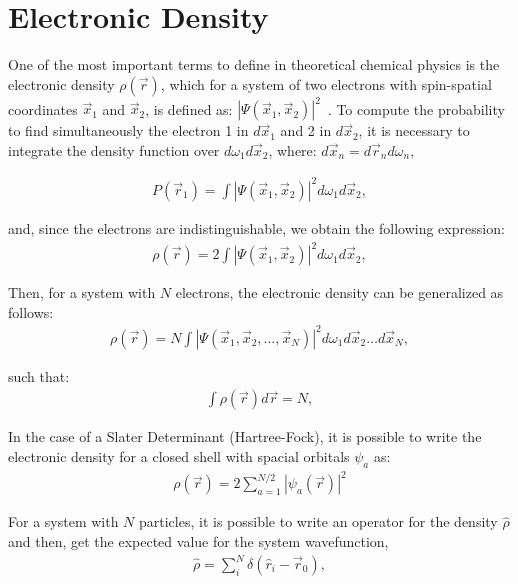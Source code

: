 \section{Electronic Density}\label{densidades}

One of the most important terms to define in theoretical chemical physics is
the electronic density $\rho (\vec{r})$, which for a system of two electrons
with spin-spatial coordinates $\vec{x}_{1}$ and $\vec{x}_2$, is defined as:
$|\Psi (\vec{x}_1 ,  \vec{x}_2)|^2$~\cite{RobertG1994}.  To compute the
probability to find simultaneously the electron 1 in $d\vec{x}_1$ and 2 in
$d\vec{x}_2$, it is necessary to integrate the density function over $d\omega_1
d\vec{x}_2$, where: $d\vec{x}_n =  d\vec{r}_n d\omega_n$,

%
\begin{align}
P(\vec{r}_1)=\int |\Psi (\vec{x}_1 ,  \vec{x}_2)|^2 d\omega_1 d\vec{x}_2 ,
\end{align}

\noindent and, since the electrons are indistinguishable, we obtain the following expression:
%
\begin{align}
\rho(\vec{r})=2\int |\Psi (\vec{x}_1 ,  \vec{x}_2)|^2 d\omega_1 d\vec{x}_2 ,
\end{align}

\noindent Then, for a system with $N$ electrons, the electronic density can be
generalized as follows:
%
\begin{align}
\rho(\vec{r})=N\int |\Psi (\vec{x}_1 ,  \vec{x}_2,  \ldots , \vec{x}_N)|^2
d\omega_1 d\vec{x}_2 \ldots d\vec{x}_N ,
\label{definition}
\end{align}

\noindent such that:
%
\begin{align}
\int\rho (\vec{r})d\vec{r} =N ,
\end{align}

\noindent In the case of a Slater Determinant (Hartree-Fock), it is possible to write
the electronic density for a closed shell with spacial orbitals ${\psi_a}$ as:
%
\begin{align}
\rho (\vec{r}) = 2 \sum_{a=1}^{N/2} |\psi_a (\vec{r})|^2 
\end{align}


For a system with $N$ particles, it is possible to write an operator for the
density $\hat{\rho}$ and then, get the expected value for the system
wavefunction,
%
\begin{align}
\hat{\rho} = \sum_i ^N \delta (\hat{r}_i - \vec{r}_0),
\end{align}

